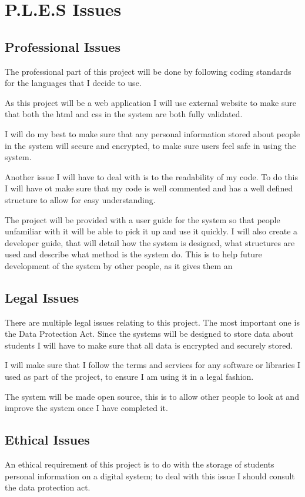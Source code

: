 \documentclass[12pt]{article}  %
\begin{document}
\section{P.L.E.S Issues}


\subsection{Professional Issues}
The professional part of this project will be done by following coding standards for the languages that I decide to use.

As this project will be a web application I will use external website to make sure that both the html and css in the system are both fully validated.

I will do my best to make sure that any personal information stored about people in the system will secure and encrypted, to make sure users feel safe in using the system.

Another issue I will have to deal with is to the readability of my code. To do this I will have ot make sure that my code is well commented and has a well defined structure to allow for easy understanding. 

The project will be provided with a  user guide for the system so that people unfamiliar with it will be able to pick it up and use it quickly. I will also create  a developer guide, that will detail how the system is designed, what structures are used and describe what method is the system do. This is to help future development of the system by other people, as it gives them an


\subsection{Legal Issues}
There are multiple legal issues relating to this project. The most important one is the Data Protection Act. Since the systems will be designed to store data about students I will have to make sure that all data is encrypted and securely stored.

I will make sure that I follow the terms and services for any software or libraries I used as part of the project, to ensure I am using it in a legal fashion.

The system will be made open source, this is to allow other people to look at and improve the system once I have completed it.


\subsection{Ethical Issues}
An ethical requirement of this project is to do with the storage of students personal information on a digital system; to deal with this issue I should consult the data protection act.
\end{document}
